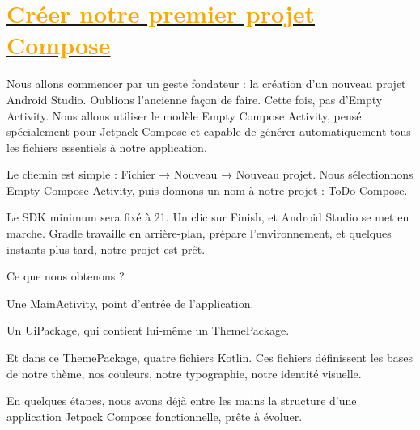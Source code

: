 \section{\hyperref[sec:sommaire]{\textcolor{orange}{Créer notre premier projet Compose}}}\label{sec:chapter-1}

\noindent
\noindent

\noindent Nous allons commencer par un geste fondateur : la création d’un nouveau projet Android Studio.
Oublions l’ancienne façon de faire. Cette fois, pas d’Empty Activity. Nous allons utiliser le modèle Empty Compose Activity, pensé spécialement pour Jetpack Compose et capable de générer automatiquement tous les fichiers essentiels à notre application.

Le chemin est simple :
Fichier → Nouveau → Nouveau projet.
Nous sélectionnons Empty Compose Activity, puis donnons un nom à notre projet : ToDo Compose.

Le SDK minimum sera fixé à 21. Un clic sur Finish, et Android Studio se met en marche.
Gradle travaille en arrière-plan, prépare l’environnement, et quelques instants plus tard, notre projet est prêt.

Ce que nous obtenons ?

Une MainActivity, point d’entrée de l’application.

Un UiPackage, qui contient lui-même un ThemePackage.

Et dans ce ThemePackage, quatre fichiers Kotlin. Ces fichiers définissent les bases de notre thème, nos couleurs, notre typographie, notre identité visuelle.

En quelques étapes, nous avons déjà entre les mains la structure d’une application Jetpack Compose fonctionnelle, prête à évoluer.